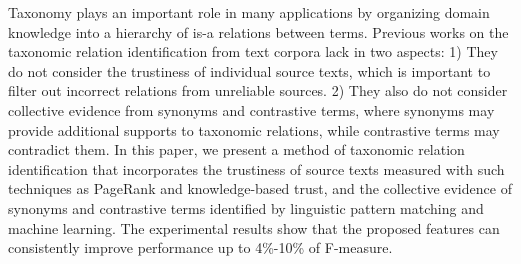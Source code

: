 Taxonomy plays an important role in many applications by organizing domain knowledge into a hierarchy of is-a relations between terms. Previous works on the taxonomic relation identification from text corpora lack in two aspects: 1) They do not consider the trustiness of individual source texts, which is important to filter out incorrect relations from unreliable sources. 2) They also do not consider collective evidence from synonyms and contrastive terms, where synonyms may provide additional supports to taxonomic relations, while contrastive terms may contradict them. In this paper, we present a method of taxonomic relation identification that incorporates the trustiness of source texts measured with such techniques as PageRank and knowledge-based trust, and the collective evidence of synonyms and contrastive terms identified by linguistic pattern matching and machine learning. The experimental results show that the proposed features can consistently improve performance up to 4\%-10\% of F-measure.
